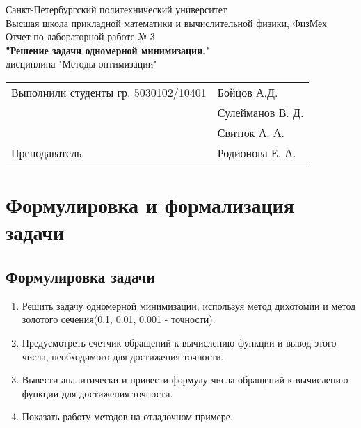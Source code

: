 \documentclass[12pt]{article}
\begin{document}
\begin{center}
	\hfill \break
	\footnotesize{Санкт-Петербургский политехнический университет}\\ 
	\footnotesize{Высшая школа прикладной математики и вычислительной физики, ФизМех}\\
	\hfill \break
    \hfill \break
	\hfill \break
    \hfill \break
	\hfill\break
	\hfill \break
	\hfill \break
	\hfill \break
	\large{Отчет по лабораторной работе № 3}\\
	\hfill \break
	\large{\textbf{"Решение задачи одномерной минимизации."{}}}\\
	\hfill \break
	\normalsize{дисциплина "Методы оптимизации"{}}\\
	\hfill \break
	\hfill \break
	\hfill \break
	\begin{tabular}{ l l }
		Выполнили студенты гр. 5030102/10401 & \hspace{1cm}Бойцов А.Д.\\
        & \hspace{1cm}Сулейманов В. Д.\\
        & \hspace{1cm}Свитюк А. А.\\
		Преподаватель & \hspace{1cm}Родионова Е. А.
	\end{tabular}
\end{center}

\newpage
\section{Формулировка и формализация задачи}
\subsection{Формулировка задачи}
    \begin{enumerate}
        \item Решить задачу одномерной минимизации, используя метод дихотомии и метод золотого сечения(0.1, 0.01, 0.001 - точности).
        \item Предусмотреть счетчик обращений к вычислению функции и вывод этого числа, необходимого для достижения точности.
        \item Вывести аналитически и привести  формулу числа обращений к вычислению функции для достижения точности.
        \item Показать работу методов на отладочном примере.
        
    \end{enumerate} 
\end{document}
